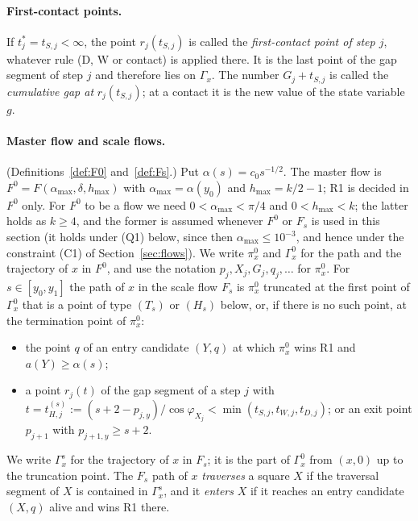 \documentclass[11pt]{amsart}
\newcommand{\amax}{\alpha_{\max}}
\newcommand{\hmax}{h_{\max}}
\newcommand{\Fz}{F^{0}}
\newcommand{\Fs}{F_{s}}
\theoremstyle{definition}
\theoremstyle{remark}
\numberwithin{equation}{section}
\begin{document}
\paragraph{First-contact points.}
If $t^*_j=t_{S,j}<\infty$, the point $r_j(t_{S,j})$ is called the \emph{first-contact point of step $j$}, whatever rule (D, W or contact) is applied there. It is the last point of the gap segment of step $j$ and therefore lies on $\Gamma_x$. The number $G_j+t_{S,j}$ is called the \emph{cumulative gap at} $r_j(t_{S,j})$; at a contact it is the new value of the state variable $g$.

\paragraph{Master flow and scale flows.}
(Definitions~\ref{def:F0} and~\ref{def:Fs}.) Put $\alpha(s)=c_0s^{-1/2}$. The master flow is $\Fz=F(\amax,\delta,\hmax)$ with $\amax=\alpha(y_0)$ and $\hmax=k/2-1$; R1 is decided in $\Fz$ only. For $\Fz$ to be a flow we need $0<\amax<\pi/4$ and $0<\hmax<k$; the latter holds as $k\ge4$, and the former is assumed whenever $\Fz$ or $\Fs$ is used in this section (it holds under (Q1) below, since then $\amax\le10^{-3}$, and hence under the constraint (C1) of Section~\ref{sec:flows}). We write $\pi^0_x$ and $\Gamma^0_x$ for the path and the trajectory of $x$ in $\Fz$, and use the notation $p_j,X_j,G_j,q_j,\dots$ for $\pi^0_x$. For $s\in[y_0,y_1]$ the path of $x$ in the scale flow $\Fs$ is $\pi^0_x$ truncated at the first point of $\Gamma^0_x$ that is a point of type $(T_s)$ or $(H_s)$ below, or, if there is no such point, at the termination point of $\pi^0_x$:
\begin{itemize}
\item[($T_s$)] the point $q$ of an entry candidate $(Y,q)$ at which $\pi^0_x$ wins R1 and $a(Y)\ge\alpha(s)$;
\item[($H_s$)] a point $r_j(t)$ of the gap segment of a step $j$ with $t=t^{(s)}_{H,j}:=(s+2-p_{j,y})/\cos\varphi_{X_j}<\min(t_{S,j},t_{W,j},t_{D,j})$; or an exit point $p_{j+1}$ with $p_{j+1,y}\ge s+2$.
\end{itemize}
We write $\Gamma^s_x$ for the trajectory of $x$ in $\Fs$; it is the part of $\Gamma^0_x$ from $(x,0)$ up to the truncation point. The $\Fs$ path of $x$ \emph{traverses} a square $X$ if the traversal segment of $X$ is contained in $\Gamma^s_x$, and it \emph{enters} $X$ if it reaches an entry candidate $(X,q)$ alive and wins R1 there.
\end{document}
